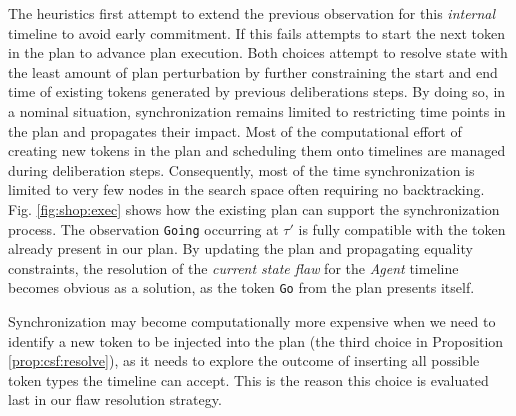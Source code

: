 The  heuristics first attempt to extend the
previous observation for this {\em internal} timeline to avoid early
commitment. If this fails \rx attempts to start the next token in the
plan to advance plan execution. Both choices attempt to resolve state
with the least amount of plan perturbation by further constraining the
start and end time of existing tokens generated by previous
deliberations steps. By doing so, in a nominal situation,
synchronization remains limited to restricting time points in the plan
and  propagates their impact. Most of the
computational effort of creating new tokens in the plan and scheduling
them onto timelines are managed during deliberation
steps. Consequently, most of the time synchronization is limited to
very few nodes in the \eu search space often requiring no
backtracking. Fig. \ref{fig:shop:exec} shows how the existing plan can
support the synchronization process. The observation \texttt{Going}
occurring at $\tau'$ is fully compatible with the token already
present in our plan. By updating the plan and propagating equality
constraints, the resolution of the {\em current state flaw} for the
{\em Agent} timeline becomes obvious as a solution, as the token
\texttt{Go} from the plan presents itself.

Synchronization may become computationally more expensive when we need
to identify a new token to be injected into the plan (the third choice
in Proposition \ref{prop:csf:resolve}), as it needs to explore the
outcome of inserting all possible token types the timeline can accept.
This is the reason this choice is evaluated last in our flaw
resolution strategy.



